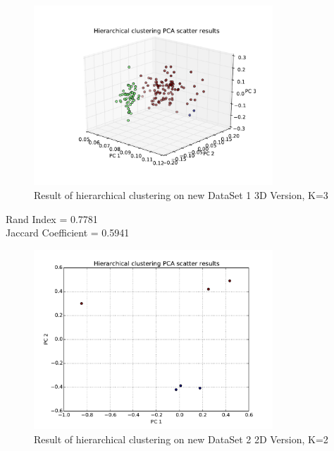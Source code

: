 \documentclass[paper=letter, fontsize=11pt]{article}
\numberwithin{equation}{section}		%
\numberwithin{figure}{section}			%
\numberwithin{table}{section}				%
\begin{document}
\begin{figure}[H]
	\centering
	\includegraphics[width=0.8\textwidth]{H_new_dataset_1_3D.pdf}
	\caption{Result of hierarchical clustering on new DataSet 1 3D Version, K=3}
\end{figure}
\noindent Rand Index = 0.7781\\
Jaccard Coefficient = 0.5941\\


\begin{figure}[H]
	\centering
	\includegraphics[width=0.8\textwidth]{H_new_dataset_2_2D.pdf}
	\caption{Result of hierarchical clustering on new DataSet 2 2D Version, K=2}
\end{figure}
\end{document}
